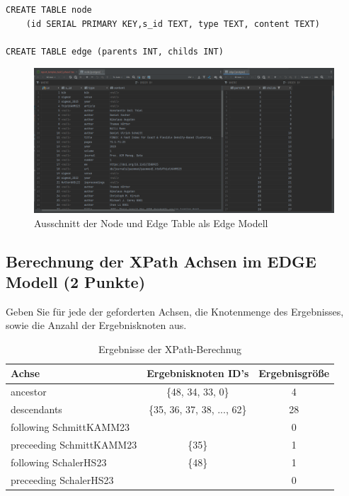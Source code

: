 \documentclass[11pt]{scrartcl}
\begin{document}
\begin{lstlisting}[style=dmrsql]
CREATE TABLE node
    (id SERIAL PRIMARY KEY,s_id TEXT, type TEXT, content TEXT)

CREATE TABLE edge (parents INT, childs INT)
\end{lstlisting}

\begin{figure}[H]
    \includegraphics[width=\linewidth]{ausschnitt_node_table.png}
    \caption{Ausschnitt der Node und Edge Table als Edge Modell}\label{fig:node}
\end{figure}

\subsection*{Berechnung der XPath Achsen im EDGE Modell (2 Punkte)}

Geben Sie für jede der geforderten Achsen, die Knotenmenge des Ergebnisses, sowie die Anzahl der Ergebnisknoten aus.

\begin{table}[h]
	\centering
		\begin{center}
			\begin{tabular}{ l | c c }
				\toprule
				Achse & Ergebnisknoten ID's & Ergebnisgröße\\
				\midrule
				ancestor & \{48, 34, 33, 0\} & 4 \\
				descendants & \{35, 36, 37, 38, ..., 62\} & 28 \\
				following SchmittKAMM23 & \emptyset & 0 \\
				preceeding SchmittKAMM23 & \{35\} & 1 \\
				following SchalerHS23 & \{48\} & 1 \\
				preceeding SchalerHS23 & \emptyset & 0 \\
				\bottomrule
			\end{tabular}
			\end{center}
	\caption{Ergebnisse der XPath-Berechnug}
	\label{tab:ErgebnisseDerXPathBerechnug}
\end{table}
\end{document}
